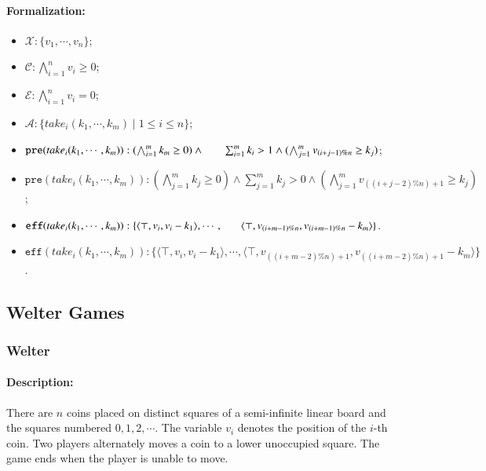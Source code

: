 \documentclass[review]{elsarticle}
\newcommand{\set}[1]{\{ #1 \}}
\newcommand{\tuple}[1]{\langle {#1} \rangle}
\newcommand{\true}{\top}
\newcommand{\statevar}{\mathcal{X}}
\newcommand{\act}{\mathcal{A}}
\newcommand{\constraint}{\mathcal{C}}
\newcommand{\estate}{\mathcal{E}}
\newcommand{\pre}{\mathtt{pre}}
\newcommand{\eff}{\mathtt{eff}}
\begin{document}
\paragraph{Formalization:}
\begin{itemize}
	\item $\statevar: \set{v_1, \cdots, v_n}$;
	\item $\constraint: \bigwedge_{i=1}^{n} v_i \ge 0$;
	\item $\estate: \bigwedge_{i=1}^{n} v_i = 0$;
	\item $\act:\set{take_i(k_1, \cdots, k_m) {\mid} 1 \le i \le n}$;
	\item $\pre(take_i(k_1, \cdots, k_m)) : (\bigwedge_{i=1}^{m} k_m\ge 0) \wedge \\ \hspace*{6mm}
	\sum_{i=1}^{m} k_i > 1 \wedge 
	(\bigwedge_{j=1}^{m} v_{(i+j-1)\%n}\ge k_j)$;
	\item {\color{red}$\pre(take_i(k_1, \cdots, k_m)) : (\bigwedge_{j=1}^{m} k_j \ge 0) \wedge \sum_{j=1}^{m} k_j > 0 \wedge (\bigwedge_{j=1}^{m} v_{((i+j-2)\% n)+1} \ge k_j)$;}
	\item $\eff(take_i(k_1, \cdots, k_m)) : \set{\tuple{\true, v_i, v_i - k_1},\cdots, \\\hspace*{6mm}
		\tuple{\true, v_{(i+m-1)\%n}, v_{(i+m-1)\%n} - k_m}}$.
	\item {\color{red}$\eff(take_i(k_1, \cdots, k_m)) : \set{\tuple{\true, v_i, v_i - k_1}, \cdots, \tuple{\true, v_{((i+m-2)\% n)+1}, v_{((i+m-2)\% n)+1} - k_m}}$.}
\end{itemize}

\subsection{Welter Games}
\subsubsection{Welter \protect\cite{Wel1952}}

\paragraph{Description:} 
There are $n$ coins placed on distinct squares of a semi-infinite linear board and the squares numbered $0, 1, 2, \cdots$.
The variable $v_i$ denotes the position of the $i$-th coin.
Two players alternately moves a coin to a lower unoccupied square. 
The game ends when the player is unable to move.
\end{document}
